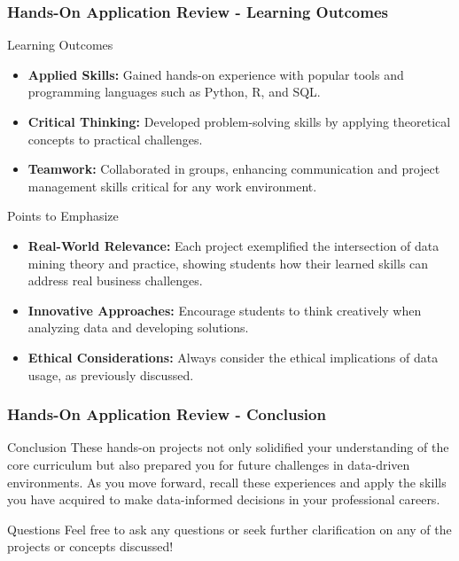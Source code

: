 \documentclass{beamer}
\begin{document}
\begin{frame}[fragile]
    \frametitle{Hands-On Application Review - Learning Outcomes}
    \begin{block}{Learning Outcomes}
        \begin{itemize}
            \item \textbf{Applied Skills:} Gained hands-on experience with popular tools and programming languages such as Python, R, and SQL.
            \item \textbf{Critical Thinking:} Developed problem-solving skills by applying theoretical concepts to practical challenges.
            \item \textbf{Teamwork:} Collaborated in groups, enhancing communication and project management skills critical for any work environment.
        \end{itemize}
    \end{block}

    \begin{block}{Points to Emphasize}
        \begin{itemize}
            \item \textbf{Real-World Relevance:} Each project exemplified the intersection of data mining theory and practice, showing students how their learned skills can address real business challenges.
            \item \textbf{Innovative Approaches:} Encourage students to think creatively when analyzing data and developing solutions.
            \item \textbf{Ethical Considerations:} Always consider the ethical implications of data usage, as previously discussed.
        \end{itemize}
    \end{block}
\end{frame}

\begin{frame}[fragile]
    \frametitle{Hands-On Application Review - Conclusion}
    \begin{block}{Conclusion}
        These hands-on projects not only solidified your understanding of the core curriculum but also prepared you for future challenges in data-driven environments. 
        As you move forward, recall these experiences and apply the skills you have acquired to make data-informed decisions in your professional careers.
    \end{block}

    \begin{block}{Questions}
        Feel free to ask any questions or seek further clarification on any of the projects or concepts discussed!
    \end{block}
\end{frame}
\end{document}
